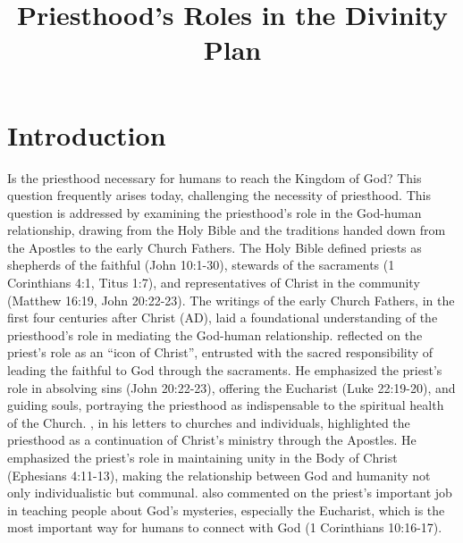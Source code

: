 \documentclass[12pt,doc]{apa7}   	%
\title{Priesthood's Roles in the Divinity Plan}	%
\begin{document}
\maketitle
\renewcommand{\baselinestretch}{1}
\renewcommand{\baselinestretch}{1}

\section{Introduction}
Is the priesthood necessary for humans to reach the Kingdom of God? This question frequently arises today, challenging the necessity of priesthood. This question is addressed by examining the priesthood’s role in the God-human relationship, drawing from the Holy Bible and the traditions handed down from the Apostles to the early Church Fathers. The Holy Bible \citep{nelson_nkjv} defined priests as shepherds of the faithful (John 10:1-30), stewards of the sacraments (1 Corinthians 4:1, Titus 1:7), and representatives of Christ in the community (Matthew 16:19, John 20:22-23). The writings of the early Church Fathers, in the first four centuries after Christ (AD), laid a foundational understanding of the priesthood’s role in mediating the God-human relationship.  \citet{priesthood_chrysostom} reflected on the priest’s role as an ``icon of Christ'', entrusted with the sacred responsibility of leading the faithful to God through the sacraments. He emphasized the priest’s role in absolving sins (John 20:22-23), offering the Eucharist (Luke 22:19-20), and guiding souls, portraying the priesthood as indispensable to the spiritual health of the Church.  \citet{epistles_ignatius}, in his letters to churches and individuals, highlighted the priesthood as a continuation of Christ’s ministry through the Apostles. He emphasized the priest’s role in maintaining unity in the Body of Christ (Ephesians 4:11-13), making the relationship between God and humanity not only individualistic but communal. \citet{st_basil_letters} also commented on the priest’s important job in teaching people about God’s mysteries, especially the Eucharist, which is the most important way for humans to connect with God (1 Corinthians 10:16-17). 
\end{document}
